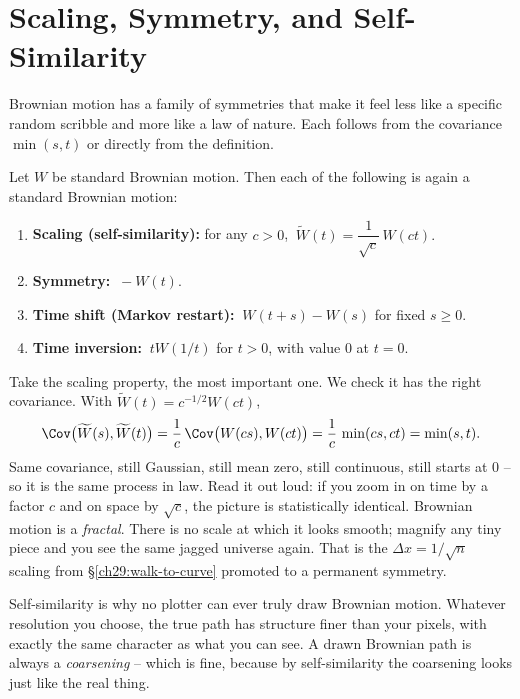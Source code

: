\section{Scaling, Symmetry, and Self-Similarity}
\label{ch29:scaling}

Brownian motion has a family of symmetries that make it feel less like a specific
random scribble and more like a law of nature. Each follows from the covariance
$\min(s,t)$ or directly from the definition.

\begin{proposition}[Invariances]
\label{ch29:prop-invariance}
Let $W$ be standard Brownian motion. Then each of the following is again a
standard Brownian motion:
\begin{enumerate}
  \item \textbf{Scaling (self-similarity):} for any $c>0$,
  $\ \widetilde W(t) = \dfrac{1}{\sqrt c}\,W(ct).$
  \item \textbf{Symmetry:} $\ -W(t).$
  \item \textbf{Time shift (Markov restart):} $\ W(t+s)-W(s)$ for fixed $s\ge0$.
  \item \textbf{Time inversion:} $\ tW(1/t)$ for $t>0$, with value $0$ at $t=0$.
\end{enumerate}
\end{proposition}

\begin{whybox}
Take the scaling property, the most important one. We check it has the right
covariance. With $\widetilde W(t) = c^{-1/2}W(ct)$,
\[
  \Cov\big(\widetilde W(s),\widetilde W(t)\big)
  = \frac1c\,\Cov\big(W(cs),W(ct)\big)
  = \frac1c\,\min(cs,ct)
  = \min(s,t).
\]
Same covariance, still Gaussian, still mean zero, still continuous, still starts
at $0$ -- so it is the same process in law. Read it out loud: if you zoom in on
time by a factor $c$ and on space by $\sqrt c$, the picture is statistically
identical. Brownian motion is a \emph{fractal}. There is no scale at which it
looks smooth; magnify any tiny piece and you see the same jagged universe again.
That is the $\Delta x = 1/\sqrt n$ scaling from \S\ref{ch29:walk-to-curve}
promoted to a permanent symmetry.
\end{whybox}

\begin{aestheticbox}
Self-similarity is why no plotter can ever truly draw Brownian motion. Whatever
resolution you choose, the true path has structure finer than your pixels, with
exactly the same character as what you can see. A drawn Brownian path is always a
\emph{coarsening} -- which is fine, because by self-similarity the coarsening
looks just like the real thing.
\end{aestheticbox}

